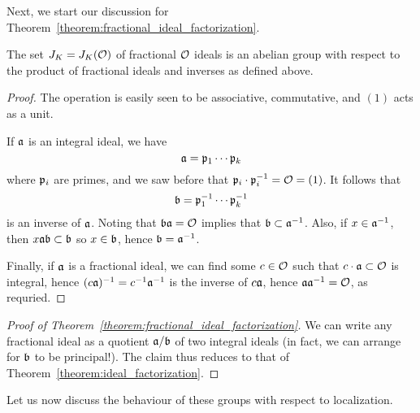 Next, we start our discussion for Theorem~\ref{theorem:fractional_ideal_factorization}.

\begin{proposition}
  The set $J_{K} = J_{K}(\mathcal{O})$ of fractional $\mathcal{O}$ ideals is an abelian group with respect to the product of fractional ideals and inverses as defined above.
\end{proposition}
\begin{proof}
  The operation is easily seen to be associative, commutative, and $(1)$ acts as a unit.

  If $\mathfrak{a}$ is an integral ideal, we have
  \[ \mathfrak{a} = \mathfrak{p}_{1} \cdots \mathfrak{p}_{k} \]
  where $\mathfrak{p}_{i}$ are primes, and we saw before that $\mathfrak{p}_{i} \cdot \mathfrak{p}_{i}^{-1} = \mathcal{O} = (1)$.
  It follows that
  \[ \mathfrak{b} = \mathfrak{p}_{1}^{-1} \cdots \mathfrak{p}_{k}^{-1} \]
  is an inverse of $\mathfrak{a}$.
  Noting that $\mathfrak{b} \mathfrak{a} = \mathcal{O}$ implies that $\mathfrak{b} \subset \mathfrak{a}^{-1}$.
  Also, if $x \in \mathfrak{a}^{-1}$, then $x \mathfrak{a} \mathfrak{b} \subset \mathfrak{b}$ so $x \in \mathfrak{b}$, hence $\mathfrak{b} = \mathfrak{a}^{-1}$.

  Finally, if $\mathfrak{a}$ is a fractional ideal, we can find some $c \in \mathcal{O}$ such that $c \cdot \mathfrak{a} \subset \mathcal{O}$ is integral, hence $(c \mathfrak{a})^{-1} = c^{-1} \mathfrak{a}^{-1}$ is the inverse of $c \mathfrak{a}$, hence $\mathfrak{a} \mathfrak{a}^{-1} = \mathcal{O}$, as requried.
\end{proof}

\begin{proof}[Proof of Theorem~\ref{theorem:fractional_ideal_factorization}]
  We can write any fractional ideal as a quotient $\mathfrak{a} / \mathfrak{b}$ of two integral ideals (in fact, we can arrange for $\mathfrak{b}$ to be principal!).
  The claim thus reduces to that of Theorem~\ref{theorem:ideal_factorization}.
\end{proof}

Let us now discuss the behaviour of these groups with respect to localization.

